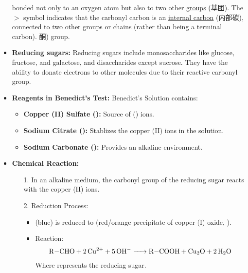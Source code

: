 \begin{itemize}
{    bonded not only to an oxygen atom but also to two other \underline{groups} (基团). The $>$ symbol indicates that the carbonyl
    carbon is an \underline{internal carbon} (内部碳), connected to two other groups or chains (rather than being a terminal
    carbon).} 酮) group.
    \item \textbf{Reducing sugars:} Reducing sugars include monosaccharides like glucose, fructose, and galactose, and
    disaccharides except sucrose. They have the ability to donate electrons to other molecules due to their reactive carbonyl
    group.
    \item \textbf{Reagents in Benedict's Test:} Benedict's Solution contains:
    \begin{itemize}
        \item \textbf{Copper (II) Sulfate ():} Source of () ions.
        \item \textbf{Sodium Citrate ():} Stablizes the copper (II) ions in the solution.
        \item \textbf{Sodium Carbonate ():} Provides an alkaline environment.
    \end{itemize}
    \item \textbf{Chemical Reaction:}
    \begin{itemize}
        \item[1.] In an alkaline medium, the carbonyl group of the reducing sugar reacts with the copper (II) ions.
        \item[2.] Reduction Process:
        \begin{itemize}
            \item {} (blue) is reduced to  (red/orange precipitate of copper (I) oxide, ).
            \item Reaction:
            \begin{equation}
                \ce{R-CHO + 2Cu^2+ + 5OH^- -> R-COOH + Cu2O + 2H2O}
            \end{equation}
            Where  represents the reducing sugar.
        \end{itemize} 

\end{itemize}
\end{itemize}
